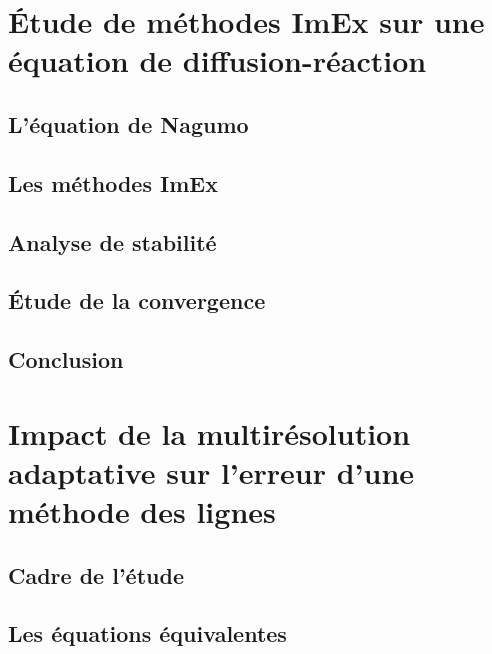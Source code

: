 \documentclass[11pt]{report}
\theoremstyle{definition}
\theoremstyle{remark}
\begin{document}
    \section{Étude de méthodes ImEx sur une équation de diffusion-réaction}
        
        \newpage
        \subsection{L'équation de Nagumo}
        \newpage
        \subsection{Les méthodes ImEx}
        \newpage
        \subsection{Analyse de stabilité}
        \subsection{Étude de la convergence}
        \subsection{Conclusion}
    
    \newpage
    \section{Impact de la multirésolution adaptative sur l'erreur d'une méthode des lignes}
        
        \subsection{Cadre de l'étude}                   
        \subsection{Les équations équivalentes}  
\end{document}

